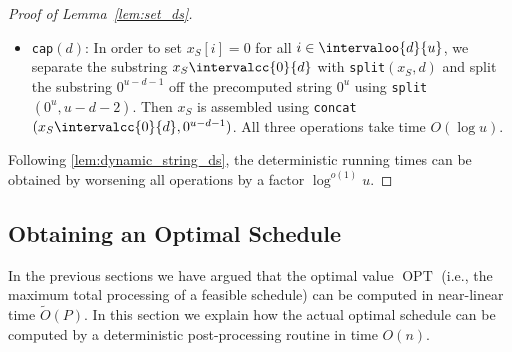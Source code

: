 \documentclass[10pt,a4paper]{article}
\DeclareMathOperator\OPT{OPT}
\newcommand\Order{O}
\newcommand\order{o}
\newcommand\Oo{O}
\newcommand{\Op}[1]{{\normalfont\texttt{#1}}}
\begin{document}
\begin{proof}[Proof of {Lemma~\ref{lem:set_ds}}]
\begin{itemize}
        Creating the shifted string $x_{S+p}$ takes time $\Oo(\log u)$.
        Both the construction of set~$D$ and computing the string~$x_{S\cup (S+p)}$ require $|(S+p)\setminus S| + |S\setminus (S+p)|$ many operations that each run in time $\Oo(\log u)$.
        Since $|S+p| = |S|$, we have 
        \[
            |(S+p)\setminus S| = |S+p| - |(S+p) \cap S| = |S| -  |(S+p) \cap S| = |S\setminus (S+p)|
        \]
        and therefore $|(S+p)\setminus S| + |S\setminus (S+p)| = 2 \cdot |(S+p)\setminus S|$.
        In summary, the \Op{sum} operation takes time $\Oo(|(S+p)\setminus S| \cdot \log u)$.
        
        \item \Op{cap}$(d)$: 
        In order to set $x_S[i] = 0$ for all $i \in \intervaloo{d}{u}$, we separate the substring $x_S\intervalcc{0}{d}$ with \Op{split}$(x_S,d)$ and split the substring $0^{u-d-1}$ off the precomputed string $0^u$ using \Op{split}$(0^u,u-d-2)$.
        Then $x_S$ is assembled using \Op{concat}$(x_S\intervalcc{0}{d},0^{u-d-1})$.
        All three operations take time $\Oo(\log u)$.
    \end{itemize}
    \smallskip
    Following \cref{lem:dynamic_string_ds}, the deterministic running times can be obtained by worsening all operations by a factor $\log^{\order(1)} u$.
\end{proof}


\subsection{Obtaining an Optimal Schedule} \label{subsec:schedule}
In the previous sections we have argued that the optimal value $\OPT$ (i.e., the maximum total processing of a feasible schedule) can be computed in near-linear time $\widetilde\Order(P)$. In this section we explain how the actual optimal schedule can be computed by a deterministic post-processing routine in time $\Order(n)$.
\end{document}
